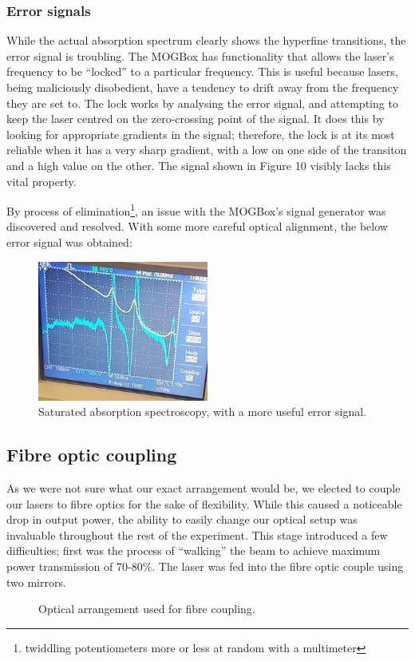 \documentclass[11pt,twoside,a4paper]{article}
\begin{document}
\subsubsection{Error signals}
While the actual absorption spectrum clearly shows the hyperfine transitions, the error signal is troubling. The MOGBox has functionality that allows the laser's frequency
to be ``locked'' to a particular frequency. This is useful because lasers, being maliciously disobedient, have a tendency to drift away from the frequency they are set to. The lock works by analysing
the error signal, and attempting to keep the laser centred on the zero-crossing point of the signal. It does this by looking for appropriate gradients in the signal; therefore, the lock is at its most
reliable when it has a very sharp gradient, with a low on one side of the transiton and a high value on the other. The signal shown in Figure 10 visibly lacks this vital property.

By process of elimination\footnote{twiddling potentiometers more or less at random with a multimeter}, an issue with the MOGBox's signal generator was discovered and resolved. With some more careful
optical alignment, the below error signal was obtained:
\begin{figure}[h]
    \centering
    \includegraphics[width=0.5\textwidth]{images/satabs-good-erro}
    \caption{Saturated absorption spectroscopy, with a more useful error signal.}
\end{figure}
\subsection{Fibre optic coupling}
As we were not sure what our exact arrangement would be, we elected to couple our lasers to fibre optics for the sake of flexibility. While this caused a noticeable drop in output power, the ability
to easily change our optical setup was invaluable throughout the rest of the experiment. This stage introduced a few difficulties; first was the process of ``walking'' the beam to achieve maximum power
transmission of 70-80\%. The laser was fed into the fibre optic couple using two mirrors.
\begin{figure}[h]
    \centering
    \caption{Optical arrangement used for fibre coupling.}
\end{figure}
\end{document}
